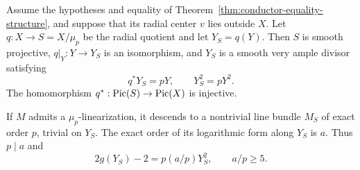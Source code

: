 \begin{proposition}\label{prop:external-conductor-descent}
Assume the hypotheses and equality of
Theorem~\ref{thm:conductor-equality-structure}, and suppose that
its radial center $v$ lies outside $X$. Let
$q:X\to S=X/\mu_p$ be the radial quotient and let $Y_S=q(Y)$.
Then $S$ is smooth projective, $q|_Y:Y\to Y_S$ is an isomorphism,
and $Y_S$ is a smooth very ample divisor satisfying
\begin{equation}\label{eq:external-quotient-polarization}
 q^*Y_S=pY,\qquad Y_S^2=pY^2.
\end{equation}
The homomorphism $q^*:\operatorname{Pic}(S)\to\operatorname{Pic}(X)$ is injective.

If $M$ admits a $\mu_p$-linearization, it descends to a nontrivial
line bundle $M_S$ of exact order $p$, trivial on $Y_S$.
The exact order of its logarithmic form along $Y_S$ is $a$.
Thus $p\mid a$ and
\[
 2g(Y_S)-2=p(a/p)Y_S^2,\qquad a/p\geq5.
\]
\end{proposition}

